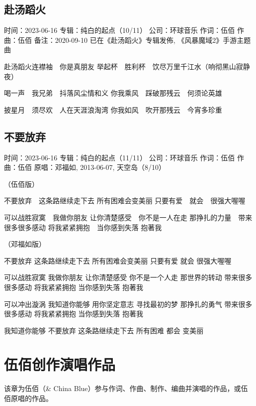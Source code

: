 \documentclass[UTF8,a4paper,oneside,twocolumn,12pt]{ctexbook}
\newcommand{\infopair}[2]{\textbullet #1：#2}
\newcommand{\zc}[1][伍佰]{\infopair{作词}{#1}}
\newcommand{\zq}[1][伍佰]{\infopair{作曲}{#1}}
\newcommand{\zj}[1]{\infopair{专辑}{#1}}
\newcommand{\yc}[1]{\infopair{原唱}{#1}}
\newcommand{\sj}[1]{\infopair{时间}{#1}}
\newcommand{\bz}[1]{\infopair{备注}{#1}}
\newcommand{\gs}[1]{\infopair{公司}{#1}}
\newenvironment{info}{\begin{flushleft}\kaishu
	}
	{\end{flushleft}\normalsize\yahei\par}
\newenvironment{lyric}{
	}
{}
\begin{document}
\section{赴汤蹈火}
\begin{info}
	\sj{2023-06-16}
	\zj{纯白的起点（10/11）}
	\gs{环球音乐}
	\zc
	\zq
	\bz{2020-09-10 已在《赴汤蹈火》专辑发佈, 《风暴魔域2》手游主题曲}
\end{info}
\begin{lyric}
	赴汤蹈火连襟袖　你是真朋友
	举起杯　胜利杯　饮尽万里千江水（响彻黑山寂静夜）

	喝一声　我兄弟　抖落风尘情和义
	你我乘风　踩破那残云　何须论英雄

	披星月　须尽欢　人在天涯浪淘湾
	你我如风　吹开那残云　今宵多珍重
\end{lyric}

\section{不要放弃}
\begin{info}
	\sj{2023-06-16}
	\zj{纯白的起点（11/11）}
	\gs{环球音乐}
	\zc
	\zq
	\yc{邓福如, 2013-06-07, 天空岛（8/10）}
\end{info}
\begin{lyric}
	（伍佰版）

	不要放弃　这条路继续走下去
	所有困难会变美丽
	只要有爱　就会　很强大喔喔

	可以战胜寂寞　我做你朋友
	让你清楚感受　你不是一人在走
	那挣扎的力量　带来很多很多感动
	将我紧紧拥抱　当你感到失落
	抱著我

	（邓福如版）

	不要放弃 这条路继续走下去
	所有困难会变美丽
	只要有爱 就会 很强大喔喔

	可以战胜寂寞 我做你朋友
	让你清楚感受 你不是一个人走
	那世界的转动 带来很多很多感动
	将我紧紧拥抱 当你感到失落
	抱著我

	可以冲出漩涡 我知道你能够
	用你坚定意志 寻找最初的梦
	那挣扎的勇气 带来很多很多感动
	将我紧紧拥抱 当你感到失落
	抱著我

	我知道你能够
	不要放弃 这条路继续走下去
	所有困难 都会 变美丽
\end{lyric}

\chapter{伍佰创作演唱作品}
该章为伍佰（\& China Blue）参与作词、作曲、制作、编曲并演唱的作品，或伍佰原唱的作品。
\end{document}
